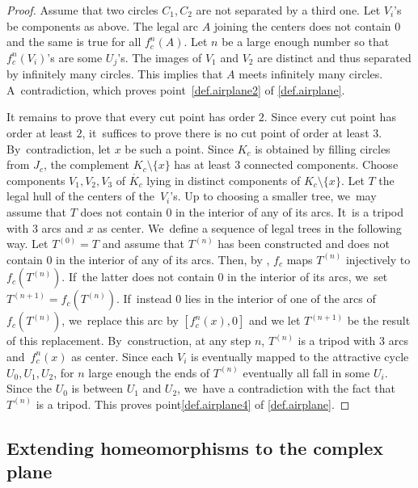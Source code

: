 \documentclass[JEP,XML,SOM,Unicode,NoFloatCountersInSection,published]{cedram}
\theoremstyle{plain}
\theoremstyle{definition}
\theoremstyle{remark}
\begin{document}
\begin{proof}
Assume that two circles $C_1,C_2$ are not separated by a third one.
Let $V_i$'s be components as above.
The legal arc $A$ joining the centers does not contain $0$ and the same is true for all $f_c^n(A)$.
Let $n$ be a large enough number so that $f^n_c(V_i)$'s are some $U_j$'s.
The images of $V_1$ and $V_2$ are distinct and thus separated by infinitely many circles.
This implies that $A$ meets infinitely many circles. A~contradiction, which proves point~\cref{def.airplane2} of \cref{def.airplane}.\enlargethispage{-.5\baselineskip}

It remains to prove that every cut point has order $2$.
Since every cut point has order at least $2$, it~suffices to prove there is no cut point of order at least $3$. By~contradiction, let $x$ be such a point.
Since $K_c$ is obtained by filling circles from $J_c$, the complement $K_c\setminus\{x\}$ has at least $3$ connected components.
Choose components $V_1,V_2,V_3$ of $\mathring{K_c}$ lying in distinct components of $K_c\setminus\{x\}$.
Let $T$ the legal hull of the centers of the~$V_i$'s.
Up to choosing a smaller tree, we~may assume that $T$ does not contain $0$ in the interior of any of its arcs. It~is a tripod with $3$ arcs and $x$ as center. We~define a sequence of legal trees in the following way.
Let $T^{(0)}=T$ and assume that $T^{(n)}$ has been constructed and does not contain $0$ in the interior of any of its arcs.
Then, by \cite[Exp.\,IV, Lem.\,1]{douady-hubbard-I}, $f_c$ maps $T^{(n)}$ injectively to $f_c(T^{(n)})$. If~the latter does not contain $0$ in the interior of its arcs, we~set $T^{(n+1)} = f_c(T^{(n)})$. If~instead $0$ lies in the interior of one of the arcs of $f_c(T^{(n)})$, we~replace this arc by $[f_c^n(x),0]$ and we let $T^{(n+1)}$ be the result of this replacement. By~construction, at any step $n$, $T^{(n)}$ is a tripod with 3 arcs and~$f_c^n(x)$ as center.
Since each $V_i$ is eventually mapped to the attractive cycle $U_0,U_1,U_2$, for $n$ large enough the ends of $T^{(n)}$ eventually all fall in some $U_i$.
Since the $U_0$ is between $U_1$ and $U_2$, we~have a contradiction with the fact that $T^{(n)}$ is a tripod.
This proves point\cref{def.airplane4} of \cref{def.airplane}.
\end{proof}

\subsection{Extending homeomorphisms to the complex plane}
\label{sub.extending.homeomorphisms}
\end{document}
